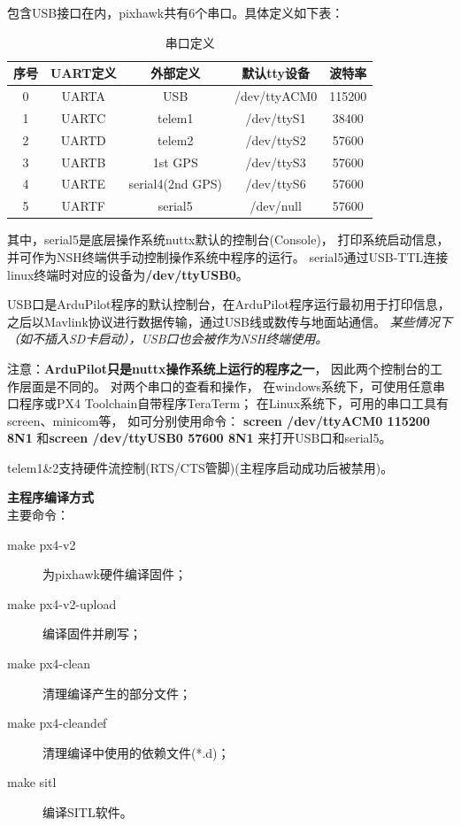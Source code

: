 \documentclass[a4paper,10pt]{ctexart} %
\begin{document}
包含USB接口在内，pixhawk共有6个串口。具体定义如下表：
\begin{table}[h] \centering   %
\caption{串口定义}
\begin{tabular}{c|c|c|c|c}\hline
序号 & UART定义  &	  外部定义		   &  默认tty设备  &	波特率 \\\hline
 0	&	UARTA	&	 USB			&	/dev/ttyACM0	&	115200 \\
 1	&	UARTC	&	 telem1			&	/dev/ttyS1	&	38400 \\
 2	&	UARTD	&	 telem2			&	/dev/ttyS2	&	57600 \\
 3	&	UARTB	&	1st GPS			&	/dev/ttyS3	&	57600 \\
 4	&	UARTE	& serial4(2nd GPS)	&	/dev/ttyS6	&	57600 \\
 5	&	UARTF	&	serial5			&	/dev/null	&	57600 \\\hline
\end{tabular}\label{table1}
\end{table}

其中，serial5是底层操作系统nuttx默认的控制台(Console)，
打印系统启动信息，并可作为NSH终端供手动控制操作系统中程序的运行。
serial5通过USB-TTL连接linux终端时对应的设备为\textbf{/dev/ttyUSB0}。

USB口是ArduPilot程序的默认控制台，在ArduPilot程序运行最初用于打印信息，
之后以Mavlink协议进行数据传输，通过USB线或数传与地面站通信。
\textit{某些情况下（如不插入SD卡启动），USB口也会被作为NSH终端使用。}

注意：\textbf{ArduPilot只是nuttx操作系统上运行的程序之一}，
因此两个控制台的工作层面是不同的。
对两个串口的查看和操作，
在windows系统下，可使用任意串口程序或PX4 Toolchain自带程序TeraTerm；
在Linux系统下，可用的串口工具有screen、minicom等，
如可分别使用命令：
\textbf{screen /dev/ttyACM0 115200 8N1}
和\textbf{screen /dev/ttyUSB0 57600 8N1}
来打开USB口和serial5。

telem1\&2支持硬件流控制(RTS/CTS管脚)(主程序启动成功后被禁用)。

\vspace{20pt}
\noindent \textbf{主程序编译方式}\\

\noindent 主要命令：\\
\vspace{-20pt}
\begin{description}
\item[make px4-v2] 为pixhawk硬件编译固件；
\item[make px4-v2-upload] 编译固件并刷写；
\item[make px4-clean] 清理编译产生的部分文件；
\item[make px4-cleandef] 清理编译中使用的依赖文件(*.d)；
\item[make sitl] 编译SITL软件。
\end{description}
\end{document}

